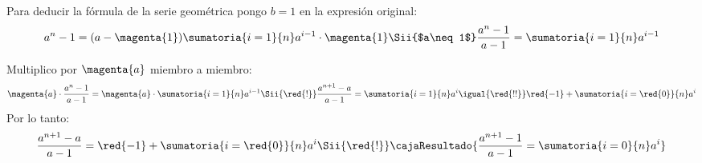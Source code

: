 \bigskip

Para deducir la fórmula de la serie geométrica pongo $b = 1$ en la expresión original:
$$
  a^n - 1 =
  (a - \magenta{1}) \sumatoria{i=1}{n} a^{i-1} \cdot \magenta{1}
  \Sii{$a\neq 1$}
  \frac{a^n - 1}{a-1} = \sumatoria{i=1}{n} a^{i-1}
$$

Multiplico por $\magenta{a}$ miembro a miembro:
$$
  \magenta{a} \cdot \frac{a^n - 1}{a-1} = \magenta{a} \cdot \sumatoria{i=1}{n} a^{i-1}
  \Sii{\red{!}}
  \frac{a^{n+1} - a}{a-1} = \sumatoria{i=1}{n} a^{i}
  \igual{\red{!!}}
  \red{-1} + \sumatoria{i = \red{0}}{n}a^i
$$
Por lo tanto:
$$
  \frac{a^{n+1} - a}{a-1}
  =
  \red{-1} + \sumatoria{i = \red{0}}{n}a^i
  \Sii{\red{!}}
  \cajaResultado{
    \displaystyle
    \frac{a^{n+1} - 1}{a-1} =
    \sumatoria{i = 0}{n} a^i
  }
$$

\begin{aportes}
  \item {}
\end{aportes}

